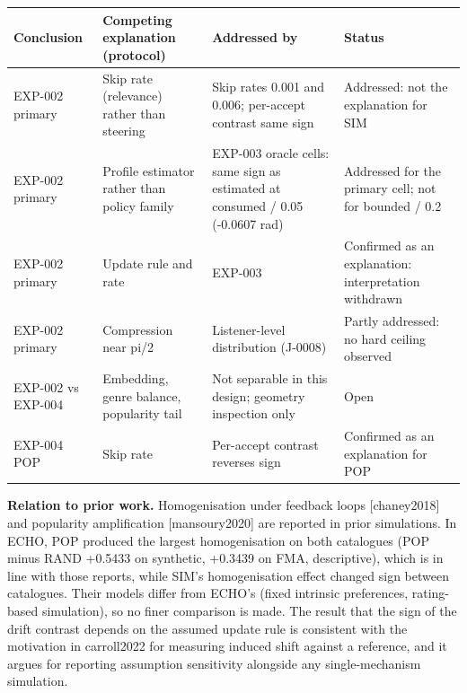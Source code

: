 \documentclass[
]{article}
\begin{document}
\begin{longtable}[]{@{}
  >{\raggedright\arraybackslash}p{}
  >{\raggedright\arraybackslash}p{}
  >{\raggedright\arraybackslash}p{}
  >{\raggedright\arraybackslash}p{}@{}}
\toprule\noalign{}
\begin{minipage}[b]{\linewidth}\raggedright
Conclusion
\end{minipage} & \begin{minipage}[b]{\linewidth}\raggedright
Competing explanation (protocol)
\end{minipage} & \begin{minipage}[b]{\linewidth}\raggedright
Addressed by
\end{minipage} & \begin{minipage}[b]{\linewidth}\raggedright
Status
\end{minipage} \\
\midrule\noalign{}
\endhead
\bottomrule\noalign{}
\endlastfoot
EXP-002 primary & Skip rate (relevance) rather than steering & Skip
rates 0.001 and 0.006; per-accept contrast same sign & Addressed: not
the explanation for SIM \\
EXP-002 primary & Profile estimator rather than policy family & EXP-003
oracle cells: same sign as estimated at consumed / 0.05 (-0.0607 rad) &
Addressed for the primary cell; not for bounded / 0.2 \\
EXP-002 primary & Update rule and rate & EXP-003 & Confirmed as an
explanation: interpretation withdrawn \\
EXP-002 primary & Compression near pi/2 & Listener-level distribution
(J-0008) & Partly addressed: no hard ceiling observed \\
EXP-002 vs EXP-004 & Embedding, genre balance, popularity tail & Not
separable in this design; geometry inspection only & Open \\
EXP-004 POP & Skip rate & Per-accept contrast reverses sign & Confirmed
as an explanation for POP \\
\end{longtable}

\textbf{Relation to prior work.} Homogenisation under feedback loops
{[}chaney2018{]} and popularity amplification {[}mansoury2020{]} are
reported in prior simulations. In ECHO, POP produced the largest
homogenisation on both catalogues (POP minus RAND +0.5433 on synthetic,
+0.3439 on FMA, descriptive), which is in line with those reports, while
SIM's homogenisation effect changed sign between catalogues. Their
models differ from ECHO's (fixed intrinsic preferences, rating-based
simulation), so no finer comparison is made. The result that the sign of
the drift contrast depends on the assumed update rule is consistent with
the motivation in carroll2022 for measuring induced shift against a
reference, and it argues for reporting assumption sensitivity alongside
any single-mechanism simulation.
\end{document}
